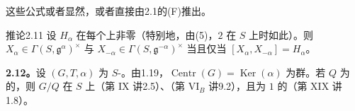 这些公式或者显然，或者直接由2.1的(F)推出。
\begin{SGAresult}{推论}{2.11}
设 $H_\alpha$ 在每个上非零（特别地，由(5)，$2$ 在 $S$ 上时如此）。则 $X_\alpha\in\Gamma(S,\mathfrak g^\alpha)^\times$ 与 $X_{-\alpha}\in\Gamma(S,\mathfrak g^{-\alpha})^\times$ 当且仅当 $[X_\alpha,X_{-\alpha}]=H_\alpha$。
\end{SGAresult}
\textbf{2.12。}设 $(G,T,\alpha)$ 为 $S$-。由1.19，$\operatorname{Centr}(G)=\operatorname{Ker}(\alpha)$ 为群。若 $Q$ 为的，则 $G/Q$ 在 $S$ 上（第 IX 讲2.5）、（第 VI$_B$ 讲9.2），且为 $1$ 的（第 XIX 讲1.8）。

